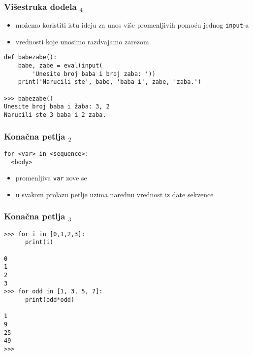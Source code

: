 \documentclass[utf8,compress,aspectratio=169]{beamer}
\begin{document}
\begin{frame}[fragile]
  \frametitle{Višestruka dodela $_4$}
  \begin{itemize}
    \item možemo koristiti istu ideju za unos više promenljivih pomoću jednog \texttt{input}-a
    \item vrednosti koje unosimo razdvajamo zarezom
  \end{itemize}
\begin{verbatim}
def babezabe():
    babe, zabe = eval(input(
        'Unesite broj baba i broj zaba: '))
    print('Narucili ste', babe, 'baba i', zabe, 'zaba.')

>>> babezabe()
Unesite broj baba i žaba: 3, 2
Narucili ste 3 baba i 2 zaba.
\end{verbatim}
\end{frame}


\begin{frame}[fragile]
  \frametitle{Konačna petlja $_2$}
\begin{verbatim}
for <var> in <sequence>:
  <body>
\end{verbatim}
\begin{itemize}
  \item promenljiva \texttt{var} zove se 
  \item u svakom prolazu petlje uzima narednu vrednost iz date sekvence
\end{itemize}
\end{frame}

\begin{frame}[fragile,shrink=10]
  \frametitle{Konačna petlja $_3$}
\begin{verbatim}
>>> for i in [0,1,2,3]:
      print(i)

0
1
2
3
>>> for odd in [1, 3, 5, 7]:
      print(odd*odd)

1
9
25
49
>>>
\end{verbatim}
\end{frame}
\end{document}

